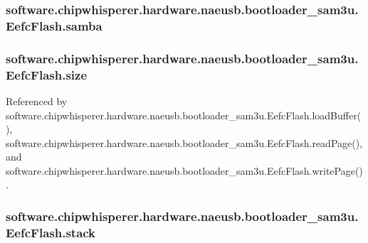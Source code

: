\subsubsection[{samba}]{\setlength{\rightskip}{0pt plus 5cm}software.\+chipwhisperer.\+hardware.\+naeusb.\+bootloader\+\_\+sam3u.\+Eefc\+Flash.\+samba}\label{classsoftware_1_1chipwhisperer_1_1hardware_1_1naeusb_1_1bootloader__sam3u_1_1EefcFlash_a48103d66c589c93816c6602f066008ac}
\hypertarget{classsoftware_1_1chipwhisperer_1_1hardware_1_1naeusb_1_1bootloader__sam3u_1_1EefcFlash_a76bfd3386f5e37e1e61efa9b48703396}{}
\subsubsection[{size}]{\setlength{\rightskip}{0pt plus 5cm}software.\+chipwhisperer.\+hardware.\+naeusb.\+bootloader\+\_\+sam3u.\+Eefc\+Flash.\+size}\label{classsoftware_1_1chipwhisperer_1_1hardware_1_1naeusb_1_1bootloader__sam3u_1_1EefcFlash_a76bfd3386f5e37e1e61efa9b48703396}


Referenced by software.\+chipwhisperer.\+hardware.\+naeusb.\+bootloader\+\_\+sam3u.\+Eefc\+Flash.\+load\+Buffer(), software.\+chipwhisperer.\+hardware.\+naeusb.\+bootloader\+\_\+sam3u.\+Eefc\+Flash.\+read\+Page(), and software.\+chipwhisperer.\+hardware.\+naeusb.\+bootloader\+\_\+sam3u.\+Eefc\+Flash.\+write\+Page().

\hypertarget{classsoftware_1_1chipwhisperer_1_1hardware_1_1naeusb_1_1bootloader__sam3u_1_1EefcFlash_a9abf938ad8675fcbc720aea244236cc4}{}
\subsubsection[{stack}]{\setlength{\rightskip}{0pt plus 5cm}software.\+chipwhisperer.\+hardware.\+naeusb.\+bootloader\+\_\+sam3u.\+Eefc\+Flash.\+stack}\label{classsoftware_1_1chipwhisperer_1_1hardware_1_1naeusb_1_1bootloader__sam3u_1_1EefcFlash_a9abf938ad8675fcbc720aea244236cc4}
\hypertarget{classsoftware_1_1chipwhisperer_1_1hardware_1_1naeusb_1_1bootloader__sam3u_1_1EefcFlash_a19e5f7148998350ce94f87032c47d145}{}

